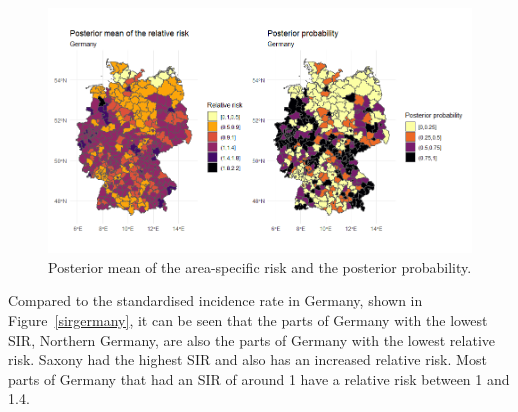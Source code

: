 \begin{figure}[H]
    \centering
    \includegraphics[width = \textwidth]{posterior_germany.png}
    \caption{Posterior mean of the area-specific risk and the posterior probability.}
    \label{posteriorGermany}
\end{figure}
%     
Compared to the standardised incidence rate in Germany, shown in Figure~\ref{sirgermany}, it can be seen that the parts of Germany with the lowest SIR, Northern Germany, are also the parts of Germany with the lowest relative risk. Saxony had the highest SIR and also has an increased relative risk. Most parts of Germany that had an SIR of around 1 have a relative risk between 1 and 1.4.

